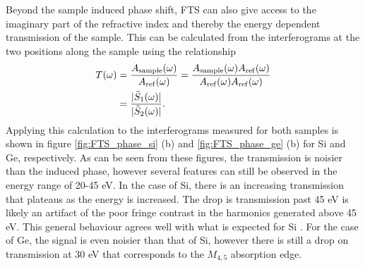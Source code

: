Beyond the sample induced phase shift, FTS can also give access to the imaginary part of the refractive index and thereby the energy dependent transmission of the sample.  This can be calculated from the interferograms at the two positions along the sample using the relationship
\begin{equation}
	\label{eqn:transmission_s1_s2}
	\begin{aligned}
		T(\omega) &= \frac{A_{\mathrm{sample}}(\omega)}{A_{\mathrm{ref}}(\omega)} = \frac{A_{\mathrm{sample}}(\omega)A_{\mathrm{ref}}(\omega)}{A_{\mathrm{ref}}(\omega)A_{\mathrm{ref}}(\omega)}\\
						&=\frac{\lvert \tilde{S}_1(\omega) \rvert}{\lvert \tilde{S}_2(\omega) \rvert}.
	\end{aligned}
\end{equation}
Applying this calculation to the interferograms measured for both samples is shown in figure \ref{fig:FTS_phase_si} (b) and \ref{fig:FTS_phase_ge} (b) for Si and Ge, respectively.  As can be seen from these figures, the transmission is noisier than the induced phase, however several features can still be observed in the energy range of 20-45 eV.  In the case of Si, there is an increasing transmission that plateaus as the energy is increased.  The drop is transmission past 45 eV is likely an artifact of the poor fringe contrast in the harmonics generated above 45 eV.  This general behaviour agrees well with what is expected for Si \cite{henkeXRayInteractionsPhotoabsorption1993}.  For the case of Ge, the signal is even noisier than that of Si, however there is still a drop on transmission at 30 eV that corresponds to the $M_{4,5}$ absorption edge.


